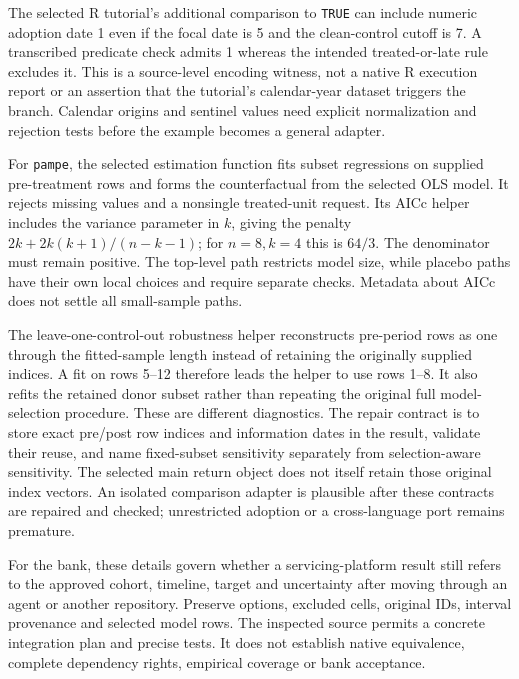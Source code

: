 The selected R tutorial's additional comparison to \texttt{TRUE} can include numeric adoption date 1 even if the focal
date is 5 and the clean-control cutoff is 7. A transcribed predicate check admits 1 whereas the intended treated-or-late
rule excludes it. This is a source-level encoding witness, not a native R execution report or an assertion that the
tutorial's calendar-year dataset triggers the branch. Calendar origins and sentinel values need explicit normalization
and rejection tests before the example becomes a general adapter.~\citep{exec28_panel_delegate_reference}

For \texttt{pampe}, the selected estimation function fits subset regressions on supplied pre-treatment rows and forms the
counterfactual from the selected OLS model. It rejects missing values and a nonsingle treated-unit request. Its AICc helper
includes the variance parameter in $k$, giving the penalty $2k+2k(k+1)/(n-k-1)$; for $n=8,k=4$ this is $64/3$.
The denominator must remain positive. The top-level path restricts model size, while placebo paths have their own local
choices and require separate checks. Metadata about AICc does not settle all small-sample paths.~\citep{exec28_panel_delegates,exec28_panel_delegate_reference}

The leave-one-control-out robustness helper reconstructs pre-period rows as one through the fitted-sample length instead
of retaining the originally supplied indices. A fit on rows 5--12 therefore leads the helper to use rows 1--8. It also refits
the retained donor subset rather than repeating the original full model-selection procedure. These are different
diagnostics. The repair contract is to store exact pre/post row indices and information dates in the result, validate
their reuse, and name fixed-subset sensitivity separately from selection-aware sensitivity. The selected main return
object does not itself retain those original index vectors. An isolated comparison adapter is plausible after these
contracts are repaired and checked; unrestricted adoption or a cross-language port remains premature.
\citep{exec28_panel_delegates,exec28_panel_delegate_reference}

For the bank, these details govern whether a servicing-platform result still refers to the approved cohort, timeline,
target and uncertainty after moving through an agent or another repository. Preserve options, excluded cells, original
IDs, interval provenance and selected model rows. The inspected source permits a concrete integration plan and precise
tests. It does not establish native equivalence, complete dependency rights, empirical coverage or bank acceptance.


